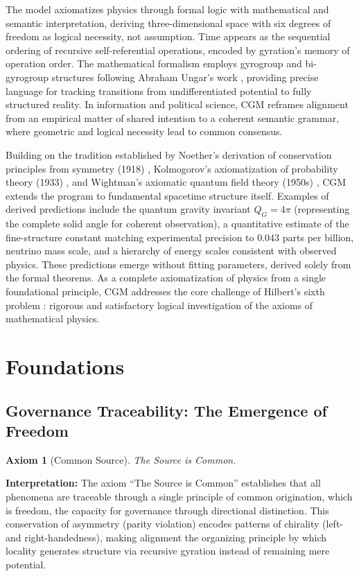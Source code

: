 \documentclass[11pt,a4paper]{article}
\newtheorem{axiom}{Axiom}
\theoremstyle{definition}
\theoremstyle{remark}
\begin{document}
The model axiomatizes physics through formal logic with mathematical and semantic interpretation, deriving three-dimensional space with six degrees of freedom as logical necessity, not assumption. Time appears as the sequential ordering of recursive self-referential operations, encoded by gyration's memory of operation order. The mathematical formalism employs gyrogroup and bi-gyrogroup structures following Abraham Ungar's work \cite{Ungar2001,Ungar2008}, providing precise language for tracking transitions from undifferentiated potential to fully structured reality. In information and political science, CGM reframes alignment from an empirical matter of shared intention to a coherent semantic grammar, where geometric and logical necessity lead to common consensus.

Building on the tradition established by Noether's derivation of conservation principles from symmetry (1918) \cite{Noether1918}, Kolmogorov's axiomatization of probability theory (1933) \cite{Kolmogorov1933}, and Wightman's axiomatic quantum field theory (1950s) \cite{Streater1964}, CGM extends the program to fundamental spacetime structure itself. Examples of derived predictions include the quantum gravity invariant $Q_G = 4\pi$ (representing the complete solid angle for coherent observation), a quantitative estimate of the fine-structure constant matching experimental precision to 0.043 parts per billion, neutrino mass scale, and a hierarchy of energy scales consistent with observed physics. These predictions emerge without fitting parameters, derived solely from the formal theorems. As a complete axiomatization of physics from a single foundational principle, CGM addresses the core challenge of Hilbert's sixth problem \cite{Hilbert1902}: rigorous and satisfactory logical investigation of the axioms of mathematical physics.

\section{Foundations}

\subsection{Governance Traceability: The Emergence of Freedom}

\begin{axiom}[Common Source]
\textit{The Source is Common.}
\end{axiom}

\noindent\textbf{Interpretation:} 
The axiom ``The Source is Common'' establishes that all phenomena are traceable through a single principle of common origination, which is freedom, the capacity for governance through directional distinction. This conservation of asymmetry (parity violation) encodes patterns of chirality (left- and right-handedness), making alignment the organizing principle by which locality generates structure via recursive gyration instead of remaining mere potential.
\end{document}
